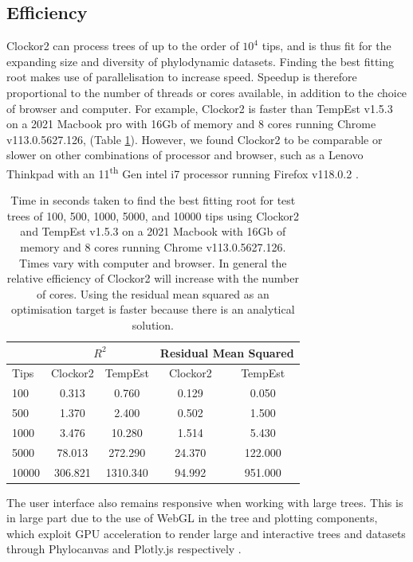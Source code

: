 \documentclass{article}
\begin{document}
\subsection*{Efficiency}
Clockor2 can process trees of up to the order of $10^4$ tips, and is thus fit for the expanding size and diversity of phylodynamic datasets. Finding the best fitting root makes use of parallelisation to increase speed. Speedup is therefore proportional to the number of threads or cores available, in addition to the choice of browser and computer. For example, Clockor2 is faster than TempEst v1.5.3 on a 2021 Macbook pro with 16Gb of memory and 8 cores running Chrome v113.0.5627.126, (Table \ref{tab:bfr}). However, we found Clockor2 to be comparable or slower on other combinations of processor and browser, {such as a Lenovo Thinkpad with an 11\textsuperscript{th} Gen intel i7 processor running Firefox v118.0.2 }. 
\begin{table}[H]
    \centering
    \caption{Time in seconds taken to find the best fitting root for test trees of 100, 500, 1000, 5000, and 10000 tips using Clockor2 and TempEst v1.5.3 on a 2021 Macbook with 16Gb of memory and 8 cores running Chrome v113.0.5627.126. Times vary with computer and browser. In general the relative efficiency of Clockor2 will increase with the number of cores. Using the residual mean squared as an optimisation target is faster because there is an analytical solution.}
    \begin{tabular}{|l|c|c|c|c|}
    		\cline{2-5}
    		\multicolumn{1}{c}{}		 & \multicolumn{2}{|c|}{$R^{2}$} & \multicolumn{2}{|c|}{Residual Mean Squared}  \\
    		\hline
        Tips    & Clockor2  & TempEst & Clockor2  & TempEst   \\
        \hline
        100  & 0.313 & 0.760 & 0.129 & 0.050 \\
        500  & 1.370 & 2.400 & 0.502 & 1.500 \\
        1000  & 3.476 & 10.280 & 1.514 & 5.430 \\
        5000 & 78.013 & 272.290 & 24.370 & 122.000 \\
        10000  & 306.821 & 1310.340 & 94.992 & 951.000 \\
        \hline
    \end{tabular}
    \label{tab:bfr}
\end{table}

The user interface also remains responsive when working with large trees. This is in large part due to the use of WebGL in the tree and plotting components, which exploit GPU acceleration to render large and interactive trees and datasets through Phylocanvas and Plotly.js respectively \citep{abudahab_phylocanvasgl_2021,plotly}.
\end{document}
